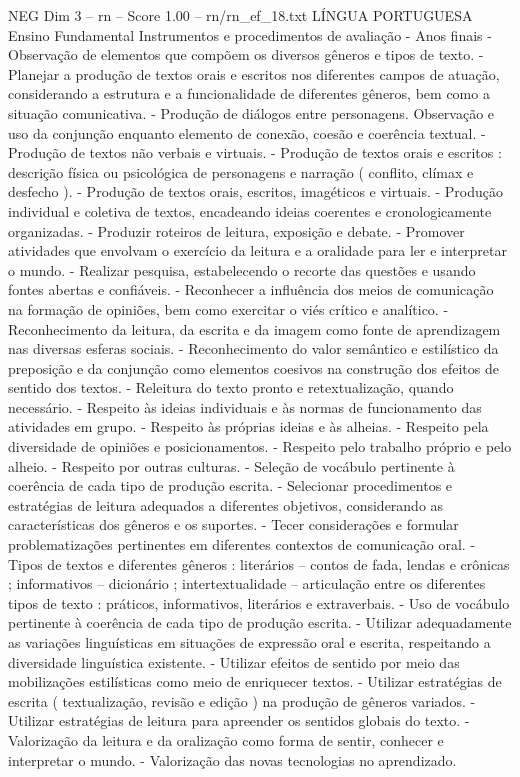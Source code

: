 \begin{textsample}{NEG Dim 3 – rn – Score 1.00 – rn/rn\_ef\_18.txt}  \label{ex:f3_neg_192}
LÍNGUA PORTUGUESA Ensino Fundamental Instrumentos e procedimentos de avaliação - Anos finais - Observação de elementos que compõem os diversos gêneros e tipos de texto. - Planejar a produção de textos orais e escritos nos diferentes campos de atuação, considerando a estrutura e a funcionalidade de diferentes gêneros, bem como a situação comunicativa. - Produção de diálogos entre personagens.
Observação e uso da conjunção enquanto elemento de conexão, coesão e coerência textual. - Produção de textos não verbais e virtuais. - Produção de textos orais e escritos : descrição física ou psicológica de personagens e narração ( conflito, clímax e desfecho ). - Produção de textos orais, escritos, imagéticos e virtuais. - Produção individual e coletiva de textos, encadeando ideias coerentes e cronologicamente organizadas. - Produzir roteiros de leitura, exposição e debate. - Promover atividades que envolvam o exercício da leitura e a oralidade para ler e interpretar o mundo. - Realizar pesquisa, estabelecendo o recorte das questões e usando fontes abertas e confiáveis. - Reconhecer a influência dos meios de comunicação na formação de opiniões, bem como exercitar o viés crítico e analítico. - Reconhecimento da leitura, da escrita e da imagem como fonte de aprendizagem nas diversas esferas sociais. - Reconhecimento do valor semântico e estilístico da preposição e da conjunção como elementos coesivos na construção dos efeitos de sentido dos textos. - Releitura do texto pronto e retextualização, quando necessário. - Respeito às ideias individuais e às normas de funcionamento das atividades em grupo. - Respeito às próprias ideias e às alheias. - Respeito pela diversidade de opiniões e posicionamentos. - Respeito pelo trabalho próprio e pelo alheio. - Respeito por outras culturas. - Seleção de vocábulo pertinente à coerência de cada tipo de produção escrita. - Selecionar procedimentos e estratégias de leitura adequados a diferentes objetivos, considerando as características dos gêneros e os suportes. - Tecer considerações e formular problematizações pertinentes em diferentes contextos de comunicação oral. - Tipos de textos e diferentes gêneros : literários – contos de fada, lendas e crônicas ; informativos – dicionário ; intertextualidade – articulação entre os diferentes tipos de texto : práticos, informativos, literários e extraverbais. - Uso de vocábulo pertinente à coerência de cada tipo de produção escrita. - Utilizar adequadamente as variações linguísticas em situações de expressão oral e escrita, respeitando a diversidade linguística existente. - Utilizar efeitos de sentido por meio das mobilizações estilísticas como meio de enriquecer textos. - Utilizar estratégias de escrita ( textualização, revisão e edição ) na produção de gêneros variados. - Utilizar estratégias de leitura para apreender os sentidos globais do texto. - Valorização da leitura e da oralização como forma de sentir, conhecer e interpretar o mundo. - Valorização das novas tecnologias no aprendizado.

\end{textsample}
